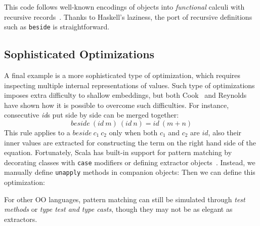 \noindent This code follows well-known encodings of objects into 
\emph{functional} calculi with recursive records~\cite{}. Thanks 
to Haskell's laziness, the port of recursive definitions such as
\lstinline{beside} is straightforward.  

\subsection{Sophisticated Optimizations}
A final example is a more sophisticated type of optimization, 
which requires inspecting multiple internal
representations of values. Such type of optimizations 
 imposes extra difficulty to shallow embeddings, but both 
Cook~\cite{cook09abstraction} and Reynolds~\cite{reynolds94proceduralabstraction} have shown how it 
is possible to overcome such difficulties. 
For instance, consecutive \emph{id}s put side by side can be merged together:
$$
beside\ (id\ m)\ (id\ n) = id\ (m + n)
$$
This rule applies to a $beside\ c_1\ c_2$ only when both $c_1$ and $c_2$ are
$id$, also their inner values are extracted for constructing the term
on the right hand side of the equation.
Fortunately, Scala has built-in support for pattern matching by decorating
classes with \lstinline{case} modifiers or defining extractor objects~\cite{emir2007matching}.
Instead, we manually define \lstinline{unapply} methods in companion
objects:
Then we can define this optimization:

For other OO languages, pattern matching can still be simulated through \emph{test methods} or \emph{type test and type casts},
though they may not be as elegant as extractors.

